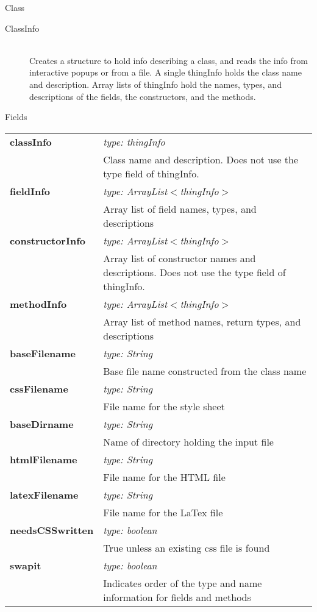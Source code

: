 \documentclass[11pt,a4paper]{article}
\newcommand \bt{\begin{longtable}{p{0.25\textwidth}p{0.74\textwidth}}}
\newcommand \et{\end{longtable}}
\newcommand{\hs}{\hspace{0.5cm}}
\newenvironment{di}
{\begin{flushright}
\begin{minipage}{0.95\textwidth}
\begin{description}
}
{\end{description}
\end{minipage}
\end{flushright}
}
\begin{document}
\noindent
\colorbox{classbg}{\parbox{1.0\textwidth}{\Large{Class}}}
\begin{di}
\item[\large{ClassInfo}]\qquad\\
Creates a structure to hold info describing a class, and reads the info from interactive popups or from a file. A single thingInfo holds the class name and description. Array lists of thingInfo hold the names, types, and descriptions of the fields, the constructors, and the methods.
\end{di}
\colorbox{fieldbg}{\parbox{1.0\textwidth}{\Large{Fields}}}\vspace{0.5cm}
\bt
\hs \textbf{classInfo} & \emph{type: thingInfo}\\
& \hs Class name and description. Does not use the type field of thingInfo.\\
\hs \textbf{fieldInfo} & \emph{type: ArrayList$<$thingInfo$>$}\\
& \hs Array list of field names, types, and descriptions\\
\hs \textbf{constructorInfo} & \emph{type: ArrayList$<$thingInfo$>$}\\
& \hs Array list of constructor names and descriptions. Does not use the type field of thingInfo.\\
\hs \textbf{methodInfo} & \emph{type: ArrayList$<$thingInfo$>$}\\
& \hs Array list of method names, return types, and descriptions\\
\hs \textbf{baseFilename} & \emph{type: String}\\
& \hs Base file name constructed from the class name\\
\hs \textbf{cssFilename} & \emph{type: String}\\
& \hs File name for the style sheet\\
\hs \textbf{baseDirname} & \emph{type: String}\\
& \hs Name of directory holding the input file\\
\hs \textbf{htmlFilename} & \emph{type: String}\\
& \hs File name for the HTML file\\
\hs \textbf{latexFilename} & \emph{type: String}\\
& \hs File name for the LaTex file\\
\hs \textbf{needsCSSwritten} & \emph{type: boolean}\\
& \hs True unless an existing css file is found\\
\hs \textbf{swapit} & \emph{type: boolean}\\
& \hs Indicates order of the type and name information for fields and methods\\
\et
\end{document}
